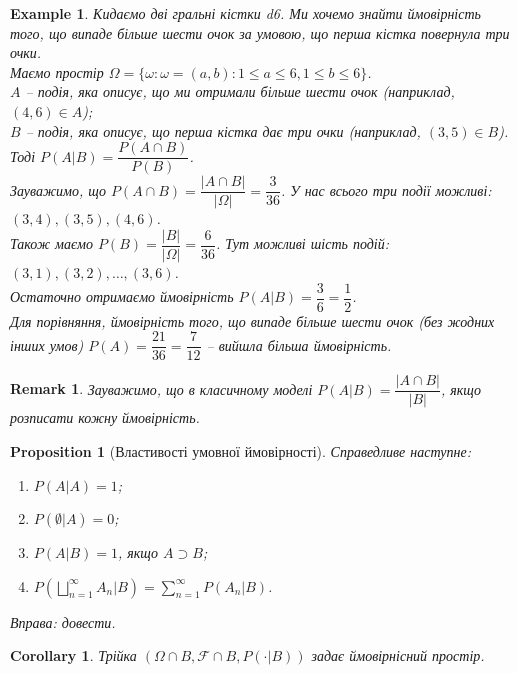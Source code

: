 \documentclass[a4paper, 10pt]{article}
\theoremstyle{theoremdd}
\newtheorem{example}[theorem]{Example}
\newtheorem{proposition}[theorem]{Proposition}
\newtheorem{remark}[theorem]{Remark}
\newtheorem{corollary}[theorem]{Corollary}
\begin{document}
\begin{example}
Кидаємо дві гральні кістки d6. Ми хочемо знайти ймовірність того, що випаде більше шести очок за умовою, що перша кістка повернула три очки.\\
Маємо простір $\Omega = \{ \omega: \omega = (a,b): 1 \leq a \leq 6, 1 \leq b \leq 6\}$.\\
$A$ -- подія, яка описує, що ми отримали більше шести очок (наприклад, $(4,6) \in A$);\\
$B$ -- подія, яка описує, що перша кістка дає три очки (наприклад, $(3,5) \in B$).\\
Тоді $P(A|B) = \dfrac{P(A \cap B)}{P(B)}$.\\
Зауважимо, що $P(A \cap B) = \dfrac{|A \cap B|}{|\Omega|} = \dfrac{3}{36}$. У нас всього три події можливі: $(3,4),(3,5),(4,6)$.\\
Також маємо $P(B) = \dfrac{|B|}{|\Omega|} = \dfrac{6}{36}$. Тут можливі шість подій: $(3,1), (3,2), \dots, (3,6)$.\\
Остаточно отримаємо ймовірність $P(A|B) = \dfrac{3}{6} = \dfrac{1}{2}$.\\
Для порівняння, ймовірність того, що випаде більше шести очок (без жодних інших умов) $P(A) = \dfrac{21}{36} = \dfrac{7}{12}$ -- вийшла більша ймовірність.
\end{example}

\begin{remark}
Зауважимо, що в класичному моделі $P(A|B) = \dfrac{|A \cap B|}{|B|}$, якщо розписати кожну ймовірність.
\end{remark}

\begin{proposition}[Властивості умовної ймовірності]
Справедливе наступне:
\begin{enumerate}[nosep,wide=0pt,label={\arabic*)}]
\item $P(A|A) = 1$;
\item $P(\emptyset|A) = 0$;
\item $P(A|B) = 1$, якщо $A \supset B$;
\item $\displaystyle P\left(\bigsqcup_{n=1}^\infty A_n | B\right) = \sum_{n=1}^\infty P(A_n | B)$.
\end{enumerate}
\textit{Вправа: довести.}
\end{proposition}

\begin{corollary}
Трійка $(\Omega \cap B, \mathcal{F} \cap B, P(\cdot | B))$ задає ймовірнісний простір.
\end{corollary}
\end{document}
